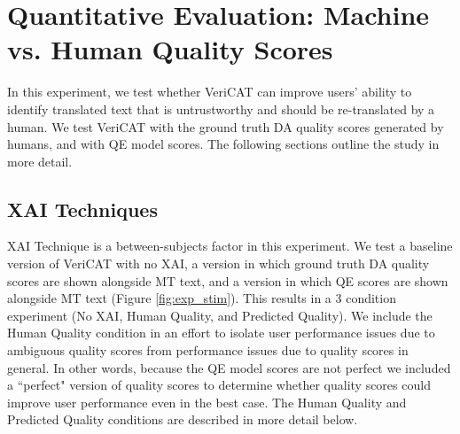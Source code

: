 \section{Quantitative Evaluation: Machine vs. Human Quality Scores} 

In this experiment, we test whether VeriCAT can improve users' ability to identify translated text that is untrustworthy and should be re-translated by a human. We test VeriCAT with the ground truth DA quality scores generated by humans, and with QE model scores. The following sections outline the study in more detail. 

\subsection{XAI Techniques} 

XAI Technique is a between-subjects factor in this experiment. We test a baseline version of VeriCAT with no XAI, a version in which ground truth DA quality scores are shown alongside MT text, and a version in which QE scores are shown alongside MT text (Figure \ref{fig:exp_stim}). This results in a 3 condition experiment (No XAI, Human Quality, and Predicted Quality). We include the Human Quality condition in an effort to isolate user performance issues due to ambiguous quality scores from performance issues due to quality scores in general. In other words, because the QE model scores are not perfect we included a ``perfect" version of quality scores to determine whether quality scores could improve user performance even in the best case. The Human Quality and Predicted Quality conditions are described in more detail below.  
 

